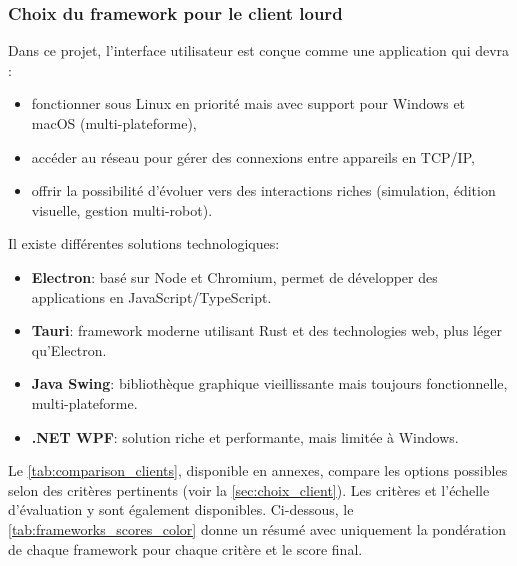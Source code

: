 \subsubsection{Choix du framework pour le client lourd} \label{sec:client_code}

Dans ce projet, l’interface utilisateur est conçue comme une application qui devra :
\begin{itemize}
    \item fonctionner sous Linux en priorité mais avec support pour Windows et macOS (multi-plateforme),
    \item accéder au réseau pour gérer des connexions entre appareils en TCP/IP,
    \item offrir la possibilité d'évoluer vers des interactions riches (simulation, édition visuelle, gestion multi-robot).
\end{itemize}

Il existe différentes solutions technologiques:
\begin{itemize}
    \item \textbf{Electron}: basé sur Node et Chromium, permet de développer des applications en JavaScript/TypeScript.
    \item \textbf{Tauri}: framework moderne utilisant Rust et des technologies web, plus léger qu’Electron.
    \item \textbf{Java Swing}: bibliothèque graphique vieillissante mais toujours fonctionnelle, multi-plateforme.
    \item \textbf{.NET WPF}: solution riche et performante, mais limitée à Windows.
\end{itemize}

Le \autoref{tab:comparison_clients}, disponible en annexes, compare les options possibles selon des critères pertinents (voir la \autoref{sec:choix_client}).
Les critères et l'échelle d'évaluation y sont également disponibles.
Ci-dessous, le \autoref{tab:frameworks_scores_color} donne un résumé avec uniquement la pondération de chaque framework pour chaque critère et le score final.


